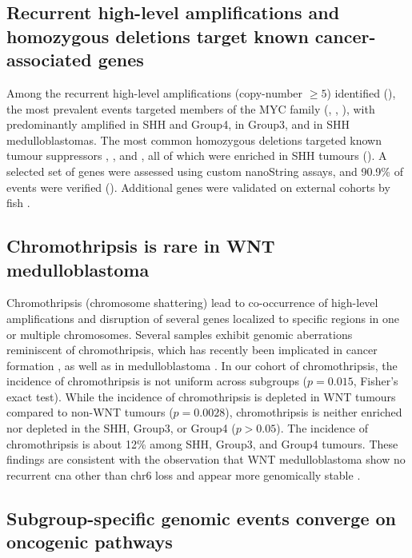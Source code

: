 \subsection{Recurrent high-level amplifications and homozygous deletions target known cancer-associated genes}

Among the recurrent high-level amplifications (copy-number $\geq 5$) identified (), the most prevalent events targeted members of the MYC family (, , ), with  predominantly amplified in SHH and Group4,  in Group3, and  in SHH medulloblastomas. The most common homozygous deletions targeted known tumour suppressors , , and , all of which were enriched in SHH tumours (). A selected set of genes were assessed using custom nanoString assays, and 90.9\% of events were verified (). Additional genes were validated on external cohorts by \gls{fish} .

\subsection{Chromothripsis is rare in WNT medulloblastoma}

Chromothripsis (chromosome shattering) lead to co-occurrence of high-level amplifications and disruption of several genes localized to specific regions in one or multiple chromosomes. Several samples exhibit genomic aberrations reminiscent of chromothripsis, which has recently been implicated in cancer formation , as well as in medulloblastoma . In our cohort of chromothripsis, the incidence of chromothripsis is not uniform across subgroups ($p = 0.015$, Fisher's exact test). While the incidence of chromothripsis is depleted in WNT tumours compared to non-WNT tumours ($p = 0.0028$), chromothripsis is neither enriched nor depleted in the SHH, Group3, or Group4 ($p > 0.05$). The incidence of chromothripsis is about 12\% among SHH, Group3, and Group4 tumours. These findings are consistent with the observation that WNT medulloblastoma show no recurrent \gls{cna} other than chr6 loss and appear more genomically stable .

\subsection{Subgroup-specific genomic events converge on oncogenic pathways}

